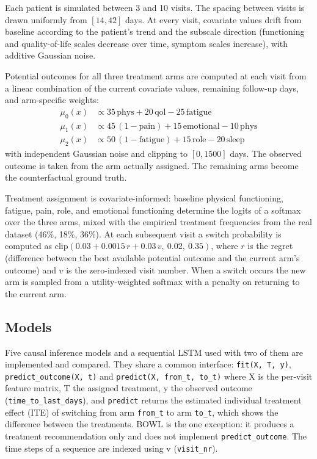 \documentclass{article}
\begin{document}
Each patient is simulated between 3 and 10 visits. The spacing between visits is drawn uniformly from $[14, 42]$ days. At every visit, covariate values drift from baseline according to the patient's trend and the subscale direction (functioning and quality-of-life scales decrease over time, symptom scales increase), with additive Gaussian noise.

Potential outcomes for all three treatment arms are computed at each visit from a linear combination of the current covariate values, remaining follow-up days, and arm-specific weights:
\begin{align}
    \mu_0(x) &\propto 35\,\text{phys} + 20\,\text{qol} - 25\,\text{fatigue} \\
    \mu_1(x) &\propto 45\,(1 - \text{pain}) + 15\,\text{emotional} - 10\,\text{phys} \\
    \mu_2(x) &\propto 50\,(1 - \text{fatigue}) + 15\,\text{role} - 20\,\text{sleep}
\end{align}
with independent Gaussian noise and clipping to $[0, 1500]$ days. The observed outcome is taken from the arm actually assigned. The remaining arms become the counterfactual ground truth.

Treatment assignment is covariate-informed: baseline physical functioning, fatigue, pain, role, and emotional functioning determine the logits of a softmax over the three arms, mixed with the empirical treatment frequencies from the real dataset (46\%, 18\%, 36\%). At each subsequent visit a switch probability is computed as $\text{clip}(0.03 + 0.0015\,r + 0.03\,v,\ 0.02,\ 0.35)$, where $r$ is the regret (difference between the best available potential outcome and the current arm's outcome) and $v$ is the zero-indexed visit number. When a switch occurs the new arm is sampled from a utility-weighted softmax with a penalty on returning to the current arm.

\subsection{Models}

Five causal inference models and a sequential LSTM used with two of them are implemented and compared. They share a common interface: \texttt{fit(X, T, y)}, \texttt{predict\_outcome(X, t)} and \texttt{predict(X, from\_t, to\_t)} where X is the per-visit feature matrix, T the assigned treatment, y the observed outcome (\texttt{time\_to\_last\_days}), and \texttt{predict} returns the estimated individual treatment effect (ITE) of switching from arm \texttt{from\_t} to arm \texttt{to\_t}, which shows the difference between the treatments. BOWL is the one exception: it produces a treatment recommendation only and does not implement \texttt{predict\_outcome}. The time steps of a sequence are indexed using v (\texttt{visit\_nr}).
\end{document}
